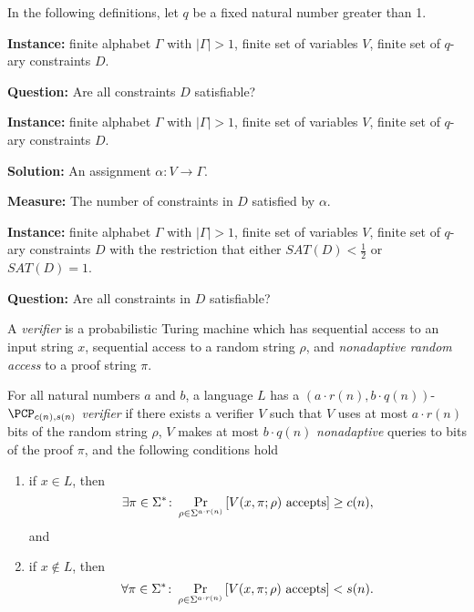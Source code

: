 \documentclass[]{article}
\begin{document}
In the following definitions, let $q$ be a fixed natural number greater than 1.

\begin{definition}
  \mbox{}

  \textbf{Instance:} finite alphabet $\Gamma$ with $|\Gamma| > 1$, finite set of variables $V$, finite set of $q$-ary constraints $D$.

  \textbf{Question:} Are all constraints $D$ satisfiable?
\end{definition}

\begin{definition}
  \mbox{}

  \textbf{Instance:} finite alphabet $\Gamma$ with $|\Gamma| > 1$, finite set of variables $V$, finite set of $q$-ary constraints $D$.

  \textbf{Solution:} An assignment $\alpha \colon V \to \Gamma$.

  \textbf{Measure:} The number of constraints in $D$ satisfied by $\alpha$.
\end{definition}

\begin{definition}
  \mbox{}

  \textbf{Instance:} finite alphabet $\Gamma$ with $|\Gamma| > 1$, finite set of variables $V$, finite set of $q$-ary constraints $D$ with the restriction that either $SAT(D) < \frac{1}{2}$ or $SAT(D) = 1$.

  \textbf{Question:} Are all constraints in $D$ satisfiable?
\end{definition}

\begin{definition}
  A \emph{\PCP{} verifier} is a probabilistic Turing machine which has sequential access to an input string $x$, sequential access to a random string $\rho$, and \emph{nonadaptive random access} to a proof string $\pi$.
\end{definition}

\begin{definition}
  For all natural numbers $a$ and $b$, a language $L$ has a $(a \cdot r(n), b \cdot q(n))$-\emph{$\PCP_{c(n), s(n)}$ verifier} if there exists a \PCP{} verifier $V$ such that $V$ uses at most $a \cdot r(n)$ bits of the random string $\rho$, $V$ makes at most $b \cdot q(n)$ \emph{nonadaptive} queries to bits of the proof $\pi$, and the following conditions hold
  \begin{enumerate}
  \item if $x \in L$, then
    \begin{equation*}
      \exists \pi \in \Sigma^* \colon \Pr_{\rho \in \Sigma^{a \cdot r(n)}}{\left[V(x, \pi; \rho) \textnormal{ accepts}\right]} \geq c(n),
    \end{equation*}
    and
  \item if $x \notin L$, then
    \begin{equation*}
      \forall \pi \in \Sigma^* \colon \Pr_{\rho \in \Sigma^{a \cdot r(n)}}{\left[V(x, \pi; \rho) \textnormal{ accepts}\right]} < s(n).
    \end{equation*}
  \end{enumerate}
\end{definition}
\end{document}
